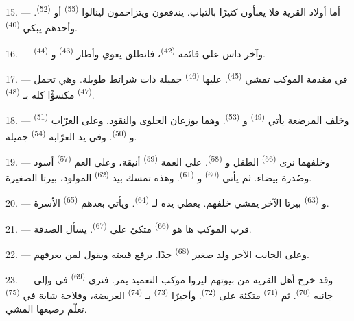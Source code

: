 15. --- أما أولاد القرية فلا يعبأون كثيرًا بالثياب. يندفعون ويتزاحمون
لينالوا  \textsuperscript{(55)} أو 
\textsuperscript{(52)}. وأحدهم يبكي \textsuperscript{(40)}.

16. --- وآخر داس على قائمة  \textsuperscript{(42)}، فانطلق يعوي
وأطار  \textsuperscript{(43)} و \textsuperscript{(44)}.

\VUsaut{5.0mm}
\VUsaut{4.0mm}

17. --- في مقدمة الموكب تمشي  \textsuperscript{(45)}. عليها
 \textsuperscript{(46)} جميلة ذات شرائط طويلة. وهي تحمل
 \textsuperscript{(47)} مكسوًّا كله بـ
\textsuperscript{(48)}.

18. --- وخلف المرضعة يأتي  \textsuperscript{(49)}
و \textsuperscript{(53)}. وهما يوزعان الحلوى والنقود. وعلى
العرّاب  \textsuperscript{(51)} و
\textsuperscript{(50)}. وفي يد العرّابة  \textsuperscript{(54)} جميلة.

19. --- وخلفهما نرى  \textsuperscript{(56)} الطفل و
\textsuperscript{(58)}. على العمة  \textsuperscript{(59)} أنيقة، وعلى
العم  \textsuperscript{(57)} أسود وصُدرة بيضاء. ثم يأتي
 \textsuperscript{(60)} و \textsuperscript{(61)}.
وهذه تمسك بيد  \textsuperscript{(62)} المولود، بيرتا الصغيرة.

20. --- و \textsuperscript{(63)} بيرتا الآخر يمشي خلفهم. يعطي يده
لـ \textsuperscript{(64)}. ويأتي بعدهم 
\textsuperscript{(65)} الأسرة.

\VUsaut{4.6mm}
\VUsaut{3.4mm}

21. --- قرب الموكب ها هو  \textsuperscript{(66)} متكئ على
 \textsuperscript{(67)}. يسأل الصدقة.

22. --- وعلى الجانب الآخر ولد صغير  \textsuperscript{(68)} جدًا.
يرفع قبعته ويقول  لمن يعرفهم.

23. --- وقد خرج أهل القرية من بيوتهم ليروا موكب التعميد يمر. فنرى
 \textsuperscript{(69)} في  وإلى جانبه
 \textsuperscript{(70)}. ثم  \textsuperscript{(71)} متكئة
على  \textsuperscript{(72)}. وأخيرًا 
\textsuperscript{(73)} بـ \textsuperscript{(74)} العريضة،
وفلاحة شابة في  \textsuperscript{(75)} تعلّم رضيعها المشي.

